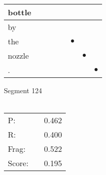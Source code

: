 \documentclass[landscape]{article}
\newcommand{\ssp}{\hspace{2pt}}
\newcommand{\mex}{\cellcolor{g}$\bullet$}
\begin{document}
\begin{tabular}{|l|p{10pt}|p{10pt}|p{10pt}|p{10pt}|p{10pt}|p{10pt}|p{10pt}|}
\hline
\ssp bottle \ssp&\hspace{2pt}&\hspace{2pt}&\hspace{2pt}&\hspace{2pt}&\hspace{2pt}&\hspace{2pt}&\hspace{2pt}\\
\hline
\ssp by \ssp&\hspace{2pt}&\hspace{2pt}&\hspace{2pt}&\hspace{2pt}&\hspace{2pt}&\hspace{2pt}&\hspace{2pt}\\
\hline
\ssp \cellcolor{ref4}the \ssp&\hspace{2pt}&\hspace{2pt}&\hspace{2pt}&\hspace{2pt}&\hspace{2pt}\mex&\hspace{2pt}&\hspace{2pt}\\
\hline
\ssp \cellcolor{ref5}nozzle \ssp&\hspace{2pt}&\hspace{2pt}&\hspace{2pt}&\hspace{2pt}&\hspace{2pt}&\hspace{2pt}\mex&\hspace{2pt}\\
\hline
\ssp \cellcolor{ref6}. \ssp&\hspace{2pt}&\hspace{2pt}&\hspace{2pt}&\hspace{2pt}&\hspace{2pt}&\hspace{2pt}&\hspace{2pt}\mex\\
\hline
\end{tabular}

\vspace{6pt}
\noindent Segment 124\\\\
\noindent\begin{tabular}{lm{12pt}r}
\hline
P:&&0.462\\
R:&&0.400\\
Frag:&&0.522\\
Score:&&0.195\\
\end{tabular}
\end{document}
